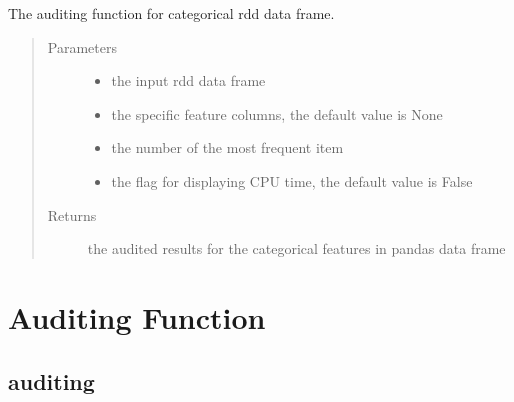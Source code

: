 \documentclass[letterpaper,12pt,english]{sphinxmanual}
\begin{document}
\begin{fulllineitems}
The auditing function for categorical rdd data frame.
\begin{quote}\begin{description}
\item[{Parameters}] \leavevmode\begin{itemize}
\item {} 
 \textendash{} the input rdd data frame

\item {} 
 \textendash{} the specific feature columns, the default value is None

\item {} 
 \textendash{} the number of the most frequent item

\item {} 
 \textendash{} the flag for displaying CPU time, the default value is False

\end{itemize}

\item[{Returns}] \leavevmode
the audited results for the categorical features in pandas data frame

\end{description}\end{quote}

\end{fulllineitems}



\section{Auditing Function}
\label{\detokenize{basics:auditing-function}}

\subsection{auditing}
\label{\detokenize{basics:auditing}}
\end{document}
